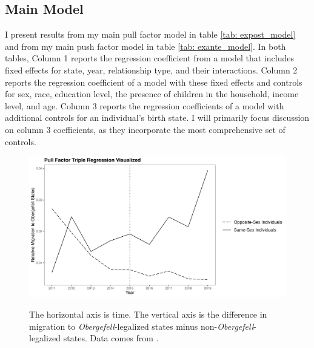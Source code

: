 \documentclass[12pt,letterpaper]{article}
\begin{document}
\FloatBarrier
\subsection{Main Model} %
I present results from my main pull factor model in table \ref{tab: expost_model} and from my main push factor model in table \ref{tab: exante_model}. In both tables, Column 1 reports the regression coefficient from a model that includes fixed effects for state, year, relationship type, and their interactions. Column 2 reports the regression coefficient of a model with these fixed effects and controls for sex, race, education level, the presence of children in the household, income level, and age. Column 3 reports the regression coefficients of a model with additional controls for an individual’s birth state. I will primarily focus discussion on column 3 coefficients, as they incorporate the most comprehensive set of controls.

\begin{figure}[htbp]
    \centering
    \caption{}
    \label{fig: post_diffs}
    \includegraphics[width=0.75\linewidth]{outputs/summary_stats/post_diffs.png}

    \vspace{0.5em}
    \begin{minipage}{0.75\linewidth}
        \footnotesize The horizontal axis is time. The vertical axis is the difference in migration to \textit{Obergefell}-legalized states minus non-\textit{Obergefell}-legalized states. Data comes from \citet{28}.
    \end{minipage}
\end{figure}
\end{document}
